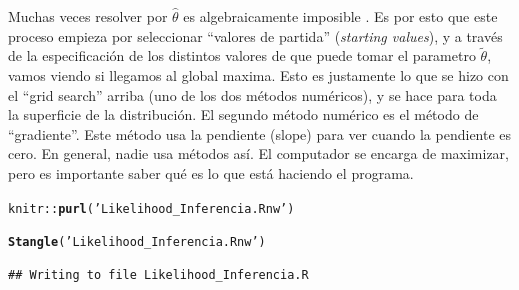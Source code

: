 \documentclass[onesided]{article}\usepackage[]{graphicx}\usepackage[]{color}
\makeatletter
\newcommand{\hlstr}[1]{\textcolor[rgb]{0.192,0.494,0.8}{#1}}%
\newcommand{\hlopt}[1]{\textcolor[rgb]{0,0,0}{#1}}%
\newcommand{\hlstd}[1]{\textcolor[rgb]{0.345,0.345,0.345}{#1}}%
\newcommand{\hlkwd}[1]{\textcolor[rgb]{0.737,0.353,0.396}{\textbf{#1}}}%
\newenvironment{kframe}{%
 \def\at@end@of@kframe{}%
 \ifinner\ifhmode%
  \def\at@end@of@kframe{\end{minipage}}%
  \begin{minipage}{\columnwidth}%
 \fi\fi%
 \def\FrameCommand##1{\hskip\@totalleftmargin \hskip-\fboxsep
 \colorbox{shadecolor}{##1}\hskip-\fboxsep
     \hskip-\linewidth \hskip-\@totalleftmargin \hskip\columnwidth}%
 \MakeFramed {\advance\hsize-\width
   \@totalleftmargin\z@ \linewidth\hsize
   \@setminipage}}%
 {\par\unskip\endMakeFramed%
 \at@end@of@kframe}
\newenvironment{knitrout}{}{} %
\makeatother
\begin{document}
Muchas veces resolver por $\hat\theta$ es algebraicamente imposible \parencite[72]{King1998}. Es por esto que este proceso empieza por seleccionar ``valores de partida'' (\emph{starting values}), y a trav\'es de la especificaci\'on de los distintos valores de que puede tomar el parametro $\tilde{\theta}$, vamos viendo si llegamos al global maxima. Esto es justamente lo que se hizo con el ``grid search'' arriba (uno de los dos m\'etodos num\'ericos), y se hace para toda la superficie de la distribuci\'on. El segundo m\'etodo num\'erico es el m\'etodo de ``gradiente''. Este m\'etodo usa la pendiente (slope) para ver cuando la pendiente es cero. En general, nadie usa m\'etodos as\'i. El computador se encarga de maximizar, pero es importante saber qu\'e es lo que est\'a haciendo el programa.


\begin{knitrout}
\color{fgcolor}\begin{kframe}
\begin{alltt}
\hlstd{knitr}\hlopt{::}\hlkwd{purl}\hlstd{(}\hlstr{'Likelihood_Inferencia.Rnw'}\hlstd{)}
\end{alltt}


{\ttfamily\noindent\bfseries{}}\begin{alltt}
\hlkwd{Stangle}\hlstd{(}\hlstr{'Likelihood_Inferencia.Rnw'}\hlstd{)}
\end{alltt}
\begin{verbatim}
## Writing to file Likelihood_Inferencia.R
\end{verbatim}
\end{kframe}
\end{knitrout}

\paragraph{}
\paragraph{}
\setcounter{page}{1}
\printbibliography
\end{document}
